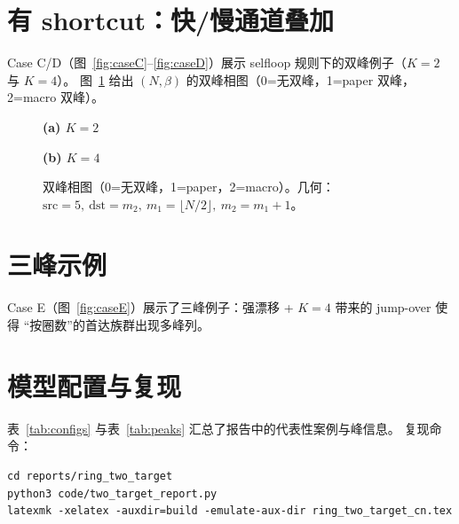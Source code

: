 \documentclass[11pt]{ctexart}
\begin{document}
\section*{有 shortcut：快/慢通道叠加}
Case C/D（图~\ref{fig:caseC}--\ref{fig:caseD}）展示 selfloop 规则下的双峰例子（$K=2$ 与 $K=4$）。
图~\ref{fig:scan} 给出 $(N,\beta)$ 的双峰相图（0=无双峰，1=paper 双峰，2=macro 双峰）。

\begin{figure}[!htbp]
  \centering
  \begin{minipage}{0.45\linewidth}
    \centering
    \textbf{(a) $K=2$}\par
  \end{minipage}%
  \hfill
  \begin{minipage}{0.45\linewidth}
    \centering
    \textbf{(b) $K=4$}\par
  \end{minipage}
  \caption{双峰相图（0=无双峰，1=paper，2=macro）。几何：$\mathrm{src}=5,\ \mathrm{dst}=m_2,\ m_1=\lfloor N/2\rfloor,\ m_2=m_1+1$。}
  \label{fig:scan}
\end{figure}

\section*{三峰示例}
Case E（图~\ref{fig:caseE}）展示了三峰例子：强漂移 + $K=4$ 带来的 jump-over 使得
“按圈数”的首达族群出现多峰列。

\section*{模型配置与复现}
表~\ref{tab:configs} 与表~\ref{tab:peaks} 汇总了报告中的代表性案例与峰信息。
复现命令：
\begin{verbatim}
cd reports/ring_two_target
python3 code/two_target_report.py
latexmk -xelatex -auxdir=build -emulate-aux-dir ring_two_target_cn.tex
\end{verbatim}
\end{document}
